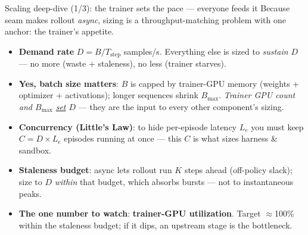 \documentclass[aspectratio=169]{beamer}
\begin{document}
\begin{frame}{Scaling deep-dive (1/3): the trainer sets the pace --- everyone feeds it}
  \footnotesize Because seam  makes rollout \emph{async}, sizing is a throughput-matching
  problem with one anchor: the trainer's appetite.
  \begin{center}
  \end{center}
  \vspace{-0.2em}
  \begin{itemize}\setlength\itemsep{0.15em}
    \item \textbf{Demand rate} $D = B / T_{\text{step}}$ samples/s. Everything else is sized to
      \emph{sustain $D$} --- no more (waste + staleness), no less (trainer starves).
    \item \textbf{Yes, batch size matters}: $B$ is capped by trainer-GPU memory (weights + optimizer
      + activations); longer sequences shrink $B_{\max}$. \emph{Trainer GPU count and $B_{\max}$
      \underline{set} $D$} --- they are the input to every other component's sizing.
    \item \textbf{Concurrency (Little's Law)}: to hide per-episode latency $L_e$ you must keep
      $C = D \times L_e$ episodes running at once --- this $C$ is what sizes harness \& sandbox.
    \item \textbf{Staleness budget}: async lets rollout run $K$ steps ahead (off-policy slack); size
      to $D$ \emph{within} that budget, which absorbs bursts --- not to instantaneous peaks.
    \item \textbf{The one number to watch}: \textbf{trainer-GPU utilization}. Target $\approx$100\%
      within the staleness budget; if it dips, an upstream stage is the bottleneck.
  \end{itemize}
\end{frame}
\end{document}
